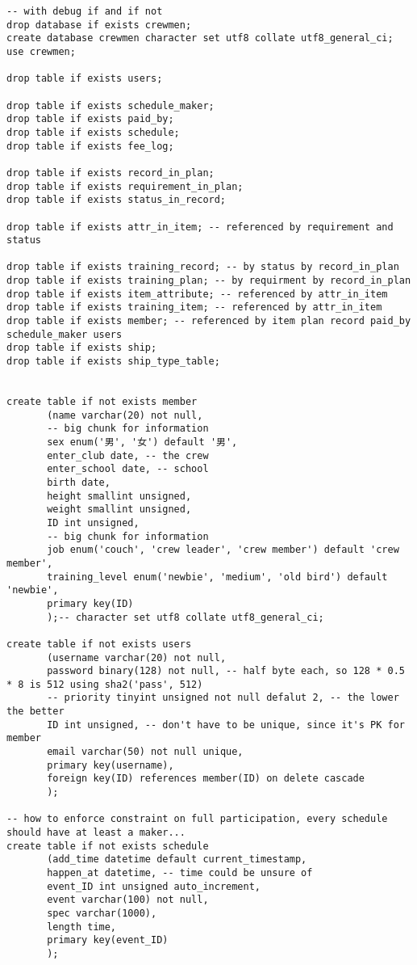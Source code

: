 \begin{Verbatim}[]
-- with debug if and if not
drop database if exists crewmen;
create database crewmen character set utf8 collate utf8_general_ci;
use crewmen;

drop table if exists users;

drop table if exists schedule_maker;
drop table if exists paid_by;
drop table if exists schedule;
drop table if exists fee_log;

drop table if exists record_in_plan;
drop table if exists requirement_in_plan;
drop table if exists status_in_record;

drop table if exists attr_in_item; -- referenced by requirement and status

drop table if exists training_record; -- by status by record_in_plan
drop table if exists training_plan; -- by requirment by record_in_plan
drop table if exists item_attribute; -- referenced by attr_in_item
drop table if exists training_item; -- referenced by attr_in_item
drop table if exists member; -- referenced by item plan record paid_by schedule_maker users
drop table if exists ship;
drop table if exists ship_type_table;


create table if not exists member
       (name varchar(20) not null,
       -- big chunk for information
       sex enum('男', '女') default '男',
       enter_club date, -- the crew
       enter_school date, -- school
       birth date,
       height smallint unsigned,
       weight smallint unsigned,
       ID int unsigned,
       -- big chunk for information
       job enum('couch', 'crew leader', 'crew member') default 'crew member',
       training_level enum('newbie', 'medium', 'old bird') default 'newbie',
       primary key(ID)
       );-- character set utf8 collate utf8_general_ci;

create table if not exists users
       (username varchar(20) not null,
       password binary(128) not null, -- half byte each, so 128 * 0.5 * 8 is 512 using sha2('pass', 512)
       -- priority tinyint unsigned not null defalut 2, -- the lower the better
       ID int unsigned, -- don't have to be unique, since it's PK for member
       email varchar(50) not null unique,
       primary key(username),
       foreign key(ID) references member(ID) on delete cascade
       );

-- how to enforce constraint on full participation, every schedule should have at least a maker...
create table if not exists schedule
       (add_time datetime default current_timestamp,
       happen_at datetime, -- time could be unsure of
       event_ID int unsigned auto_increment,
       event varchar(100) not null,
       spec varchar(1000),
       length time,
       primary key(event_ID)
       );


\end{Verbatim}
